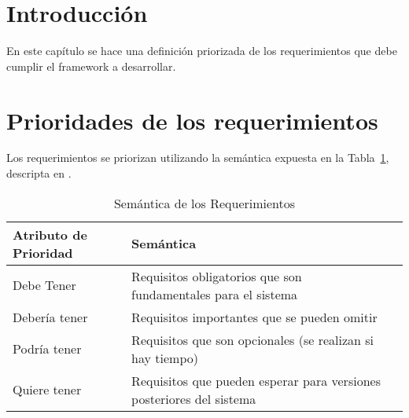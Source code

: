 \section{Introducción}
En este capítulo se hace una definición priorizada de los requerimientos que
debe cumplir el framework a desarrollar.
\section {Prioridades de los requerimientos}
    Los requerimientos se priorizan utilizando la semántica expuesta en la
    Tabla~\ref{tab:semantica_requerimientos}, descripta en
    \cite{programacionUml}.
    
\begin{table}[H]
    \centering
    \begin{tabularx}{\textwidth}{ | p{4cm} | X | X | }
    \hline
        \textbf{Atributo de Prioridad} & \textbf{Semántica} 
        \\[10pt]\hline
        Debe Tener & Requisitos obligatorios que son fundamentales para el
        sistema
        \\[10pt] \hline
        Debería tener & Requisitos importantes que se pueden omitir
        \\[10pt] \hline
        Podría tener & Requisitos que son opcionales (se realizan si hay tiempo)
        \\[10pt] \hline
        Quiere tener & Requisitos que pueden esperar para versiones posteriores
        del sistema
        \\[10pt] \hline
    \end{tabularx}
    \caption{Semántica de los Requerimientos}
    \label{tab:semantica_requerimientos}
\end{table}
    
